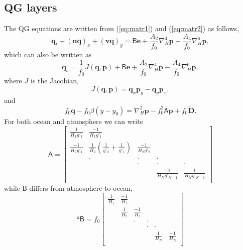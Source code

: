\documentclass[11pt, a4paper,twoside]{article}
\newcommand{\gp}[2]{{}^{#1}g'_{#2}}
\newcommand{\HH}[2]{{{}^{#1}H_{#2}}}
\newcommand{\at}[1]{{{}^{#1}A_2}}
\newcommand{\ah}[1]{{{}^{#1}A_4}}
\newcommand{\vc}[1]{\mathbf{#1}}
\newcommand{\mtx}[1]{\vc{\mathsf{#1}}}
\newcommand{\Dt}[1]{\vc{{}^{#1}\tilde{D}}}
\numberwithin{equation}{section}
\begin{document}
\subsection{QG layers}\label{sub:qglayers}
The QG equations are written from (\ref{eq:matr1}) and (\ref{eq:matr2}) as follows,
\begin{equation}\label{eq:matr1a}
\vc{q}_t  + (\vc{u} \vc{q})_x  + (\vc{v} \vc{q})_y = \mtx{B}\vc{e}  + \frac{\at{}}{f_0}\nabla_H^4 \vc{p} - \frac{\ah{}}{f_0}\nabla_H^6 \vc{p},
\end{equation}
which can also be written as
\begin{equation}\label{eq:matr1alt}
\vc{q}_t  = \frac{1}{f_0} J(\vc{q},\vc{p}) + \mtx{B}\vc{e}  + \frac{\at{}}{f_0}\nabla_H^4 \vc{p} - \frac{\ah{}}{f_0}\nabla_H^6 \vc{p},
\end{equation}
where $J$ is the Jacobian,
\[J(\vc{q},\vc{p}) =\vc{q}_x\vc{p}_y - \vc{q}_y\vc{p}_x,\]
and
\begin{equation}\label{eq:matr2a}
f_0 \vc{q} - f_0 \beta(y-y_0)  =  \nabla_H^2 \vc{p}  - f_0^2 \mtx{A}\vc{p}+ f_0 \Dt{}.
\end{equation}
For both ocean and atmosphere we can write
\begin{equation}\label{eq:mata}
\mtx{A} =
\left[ \begin{array}{cccccc}
\frac{1}{\HH{}{1} \gp{}{1}} & \frac{-1}{\HH{}{1} \gp{}{1}} &&\\
\frac{-1}{\HH{}{2} \gp{}{1}}  & \frac{1}{\HH{}{2}}\left(\frac{1}{\gp{}{2}} + \frac{1}{\gp{}{1}}\right) & \frac{-1}{\HH{}{2} \gp{}{2}} &\\
&  \cdot & \cdot& \cdot\\
 &&  \cdot & \cdot& \cdot\\
&  & &   \frac{-1}{\HH{}{N} \gp{}{N-1}}& \frac{1}{\HH{}{N} \gp{}{N-1}} \\
 \end{array}\right]
\end{equation}
while $\mtx{B}$ differs from atmosphere to ocean,
\begin{equation}
\mtx{{}^oB} = f_0
\left[ \begin{array}{cccccc}
\frac{1}{\HH{}{1}} & \frac{-1}{\HH{}{1}} & &\\
 & \frac{1}{\HH{}{2}} & \frac{-1}{\HH{}{2}} &\\
 & &  \cdot & \cdot \\
 & &  & \cdot & \cdot \\
 & &   & & \frac{1}{\HH{}{N}}& \frac{-1}{\HH{}{N}} \\
 \end{array}\right]
\end{equation}
\end{document}
